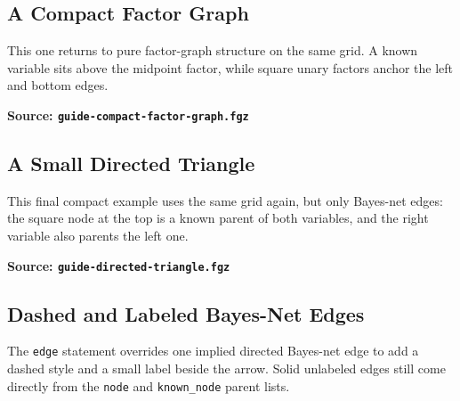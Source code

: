 \documentclass{article}
\begin{document}
\subsection{A Compact Factor Graph}
This one returns to pure factor-graph structure on the same grid. A known variable sits
above the midpoint factor, while square unary factors anchor the left and bottom edges.

\begin{samepage}
  \noindent
  \begin{minipage}[t]{0.41\textwidth}
    \centering
    \vspace{0.4cm}
    
  \end{minipage}\hfill
  \begin{minipage}[t]{0.55\textwidth}
    \textbf{Source: \texttt{guide-compact-factor-graph.fgz}}
  \end{minipage}
\end{samepage}

\subsection{A Small Directed Triangle}
This final compact example uses the same grid again, but only Bayes-net edges: the square
node at the top is a known parent of both variables, and the right variable also parents the
left one.

\begin{samepage}
  \noindent
  \begin{minipage}[t]{0.41\textwidth}
    \centering
    \vspace{0.4cm}
    
  \end{minipage}\hfill
  \begin{minipage}[t]{0.55\textwidth}
    \textbf{Source: \texttt{guide-directed-triangle.fgz}}
  \end{minipage}
\end{samepage}

\newpage
\subsection{Dashed and Labeled Bayes-Net Edges}
The \texttt{edge} statement overrides one implied directed Bayes-net edge to add a dashed
style and a small label beside the arrow. Solid unlabeled edges still come directly from the
\texttt{node} and \texttt{known\_node} parent lists.
\end{document}

